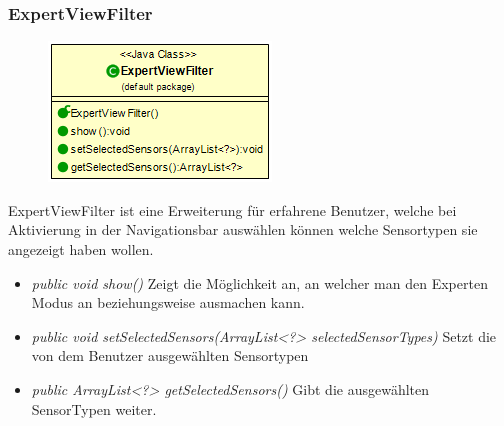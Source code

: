 \subsubsection{ExpertViewFilter}
\begin{minipage}{0.3\textwidth}
    \begin{figure}[H]
        \includegraphics[scale = 0.5
        ]{media/view/navbar/ExpertviewFilter_Class.png}
    \end{figure}
    \end{minipage} \hfill
    \begin{minipage}{0.6\textwidth}
ExpertViewFilter ist eine Erweiterung für erfahrene Benutzer, welche bei Aktivierung in der Navigationsbar auswählen können welche Sensortypen sie angezeigt haben wollen.
\end{minipage}
\begin{itemize} [noitemsep]
    \item \emph{public void show()} Zeigt die Möglichkeit an, an welcher man den Experten Modus an beziehungsweise ausmachen kann.
    \item \emph{public void setSelectedSensors(ArrayList<?> selectedSensorTypes)} Setzt die von dem Benutzer ausgewählten Sensortypen
    \item \emph{public ArrayList<?> getSelectedSensors()} Gibt die ausgewählten SensorTypen weiter.
\end{itemize}

